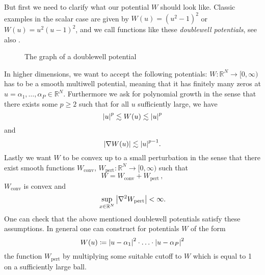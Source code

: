 But first we need to clarify what our potential $ W $ should look like. Classic 
examples in the scalar case are given by $ W ( u ) = \left( u^{ 2 } - 1 
\right)^{ 2 } $ or $ W( u ) = u^{ 2 } ( u - 1 )^{ 2 } $, and we call functions 
like these \emph{doublewell potentials}, see also 
.

\begin{figure}[ht]
	\centering
	\caption{The graph of a doublewell potential}
	\label{graph_of_doublewell_potential}
\end{figure}

In higher dimensions, we want to accept the following potentials: $ W \colon 
\mathbb{ R }^{ N } \to [0, \infty ) $ has to be a smooth multiwell potential, 
meaning that it has finitely many zeros at $ u = \alpha_{ 1 }, \dotsc , 
\alpha_{ P } \in \mathbb{ R }^{ N } $. Furthermore we ask for polynomial growth 
in the sense that there exists some $ p \geq 2 $ such that for all $ u $ 
sufficiently large, we have
\begin{equation}
	\label{polynomial_growth}
	\abs{ u }^{ p } \lesssim W(u) \lesssim \abs{ u }^{ p }
\end{equation}
and
\begin{equation}
	\label{polynomial_growth_derivative}
	\abs{ \nabla W ( u ) } \lesssim \abs{ u }^{ p -1 }.
\end{equation}
Lastly we want $ W $ to be convex up to a small perturbation in the sense that 
there exist smooth functions 
$ W_{ \mathrm{conv} }$, $ W_{ \mathrm{pert} } \colon \mathbb{ R }^{ N } \to [ 0 , \infty ) $ such that
\begin{equation}
	\label{decomposition_of_w}
	W = W_{ \mathrm{conv}} + W_{ \mathrm{pert}}\, ,
\end{equation}
$ W_{ \mathrm{conv} } $ is convex and
\begin{equation}
	\label{perturbation bound}
	\sup_{ x \in \mathbb{ R }^{ N } }
	\abs{ \nabla^{ 2 } W_{ \mathrm{pert} } } < \infty.
\end{equation}
One can check that the above mentioned doublewell potentials satisfy these 
assumptions. In general one can construct for potentials $ W $ of the form
\begin{equation*}
	W ( u ) \coloneqq
	\abs{ u - \alpha_{ 1 } }^{ 2 } 
	\cdot
	\dotsc
	\cdot
	\abs{ u - \alpha_{ P } }^{ 2 }
\end{equation*} 
the function $ W_{ \mathrm{pert} } $ by multiplying some suitable cutoff to $ W 
$ which is equal to 1 on a sufficiently large ball.

